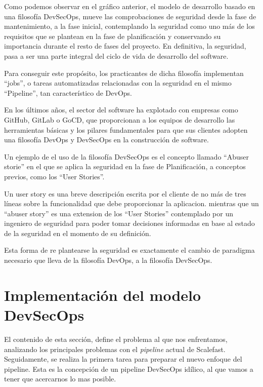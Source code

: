 \documentclass[12pt]{report} %
\begin{document}
Como podemos observar en el gráfico anterior, el modelo de desarrollo basado en
una filosofía DevSecOps, mueve las comprobaciones de seguridad desde la fase de
mantenimiento, a la fase inicial, contemplando la seguridad como uno más de los
requisitos que se plantean en la fase de planificación y conservando su
importancia durante el resto de fases del proyecto.  En definitiva, la
seguridad, pasa a ser una parte integral del ciclo de vida de desarrollo del
software. 

Para conseguir este propósito, los practicantes de dicha filosofía implementan
``jobs'', o tareas automatizadas relacionadas con la seguridad en el mismo
``Pipeline'', tan característico de DevOps.

En los últimos años, el sector del software ha explotado con empresas como
GitHub, GitLab o GoCD, que proporcionan a los equipos de desarrollo las
herramientas básicas y los pilares fundamentales para que sus clientes adopten
una filosofía DevOps y DevSecOps en la construcción de
software.\cite{Google2019}

Un ejemplo de el uso de la filosofía DevSecOps es el concepto llamado ``Abuser
storie'' \cite{Bor2006} en el que se aplica la seguridad en la fase de
Planificación, a conceptos previos, como los ``User Stories''.

Un user story es una breve descripción escrita por el cliente de no más de tres
líneas sobre la funcionalidad que debe proporcionar la aplicacion.
\cite{XPUserStory} mientras que un ``abuser story'' es una extension de los
``User Stories'' contemplado por un ingeniero de seguridad para poder tomar
decisiones informadas en base al estado de la seguridad en el momento de su
definición. \cite{Bor2006}

Esta forma de re plantearse la seguridad es exactamente el cambio de paradigma
necesario que lleva de la filosofía \gls{DevOps}, a la filosofía 
\gls{DevSecOps}.


\chapter{Implementación del modelo DevSecOps}

El contenido de esta sección, define el problema al que nos enfrentamos,
analizando los principales problemas con el \textit{\gls{pipeline}} actual de
Scalefast.
Seguidamente, se realiza la primera tarea para preparar el nuevo enfoque del
pipeline.
Esta es la concepción de un pipeline \gls{DevSecOps} idílico, al que vamos a
tener que acercarnos lo mas posible.
\end{document}
